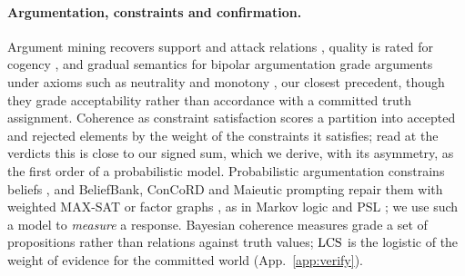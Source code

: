 \paragraph{Argumentation, constraints and confirmation.} Argument mining recovers support and attack
relations \citep{stab2017}, quality is rated for cogency \citep{wachsmuth2017,habernal2016,persing2015},
and gradual semantics for bipolar argumentation grade arguments under axioms such as neutrality and
monotony \citep{cayrol2005,amgoud2016,amgoud2018,baroni2019}, our closest precedent, though they grade
acceptability rather than accordance with a committed truth assignment. Coherence as constraint
satisfaction \citep{thagard1989,thagard1998} scores a partition into accepted and rejected elements by
the weight of the constraints it satisfies; read at the verdicts this is close to our signed sum, which
we derive, with its asymmetry, as the first order of a probabilistic model. Probabilistic
argumentation constrains beliefs \citep{thimm2012,hunter2013}, and BeliefBank, ConCoRD and Maieutic
prompting repair them with weighted MAX-SAT or factor graphs \citep{beliefbank,concord,maieutic,berant2011},
as in Markov logic and PSL \citep{mln,psl}; we use such a model to \emph{measure} a response. Bayesian
coherence measures \citep{shogenji1999,olsson2002,fitelson2003,douven2007,bovens2003} grade a set of
propositions rather than relations against truth values; $\mathrm{LCS}$ is the logistic of the weight of
evidence \citep{good1950,milne1996,fitelson1999,crupi2007} for the committed world
(App.~\ref{app:verify}).
